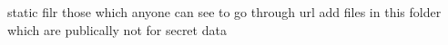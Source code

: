 static filr those which anyone can see to go through url
add files in this folder which are publically not for secret data